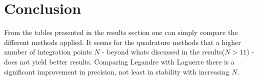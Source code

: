\documentclass[../main.tex]{subfiles}
\begin{document}
\section{Conclusion} \label{sec:conclusion}
From the tables presented in the results section one can simply compare the different methods applied. It seems for the quadrature methods that a higher number of integration points $N$ - beyond whats discussed in the results($N> 11$) - does not yield better results. %
Comparing Legandre with Laguerre there is a significant improvement in precision, not least in stability with increasing $N$.
\end{document}
